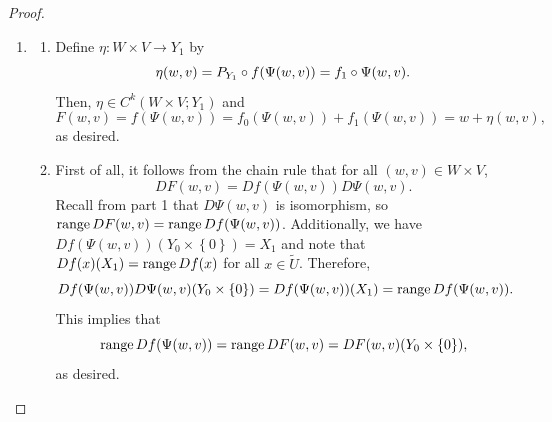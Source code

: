 \documentclass[a4paper]{article}
\begin{document}
\begin{proof}
{\begin{enumerate}
            To show $D \Psi(w, v) \vert_{Y_0 \times \left\{ 0 \right\}}
            \to X_1$ is an isomorphism for all $(w,v) \in W \times V$,
            note that $D\Psi(w,v)$ is already an isomorphism and thus
            injective. Now for any $u \in X_1$, we have
            \[
              Dg(\Psi(w, v))u = (\py \circ Df(\Psi(w, v))(u), \px u).
            \]
            Note that $\px u = 0$ since $u \in X_1$ and $\py \circ
            Df(\Psi(w, v))(u) \in Y_0$. Also, $Dg(\Psi(w, v))$ is an
            isomorphism, so
            \[
              D\Psi(w, v) (\py \circ Df(\Psi(w, v))(u), 0) = u.
            \]
            This implies that $D\Psi(w, v) (Y_0 \times \left\{ 0 \right\})
            = X_1$. Therefore, $D \Psi(w, v) \vert_{Y_0 \times \left\{ 0
            \right\}} \to X_1$ is indeed an isomorphism for all $(w,v) \in
            W \times V$.

      \item \begin{enumerate}
              \item Define $\eta: W \times V \to Y_1$ by
                    \[
                      \eta(w, v) = {P_{Y_1}} \circ f(\Psi(w, v)) = f_1 \circ \Psi(w, v).
                    \]
                    Then, $\eta \in C^k(W \times V ; Y_1)$ and
                    \[
                      F(w, v) = f (\Psi(w, v)) = f_0 (\Psi (w, v))
                      + f_1 (\Psi (w, v)) = w + \eta(w, v),
                    \]
                    as desired.

              \item First of all, it follows from the chain rule that for
                    all $(w,v) \in W \times V$,
                    \[
                      DF(w, v) = Df(\Psi(w, v)) D\Psi(w, v).
                    \]
                    Recall from part 1 that $D\Psi(w, v)$ is isomorphism,
                    so $\operatorname{range} DF(w, v) = \operatorname{range} Df(\Psi(w, v))$.
                    Additionally, we have $Df(\Psi(w, v))(Y_0 \times
                    \left\{ 0 \right\}) = X_1$ and note that $Df(x)(X_1) =
                    \operatorname{range} Df(x)$ for all $x \in \tilde{U}$. Therefore,
                    \[
                      Df(\Psi(w, v)) D\Psi(w, v) (Y_0 \times \left\{ 0 \right\})
                      = Df(\Psi(w, v))(X_1) = \operatorname{range} Df(\Psi(w, v)).
                    \]
                    This implies that
                    \[
                      \operatorname{range} Df(\Psi(w, v)) = \operatorname{range} DF(w, v) = DF(w, v)
                      (Y_0 \times \left\{ 0 \right\}),
                    \]
                    as desired.


\end{enumerate}
\end{enumerate}}
\end{proof}
\end{document}
